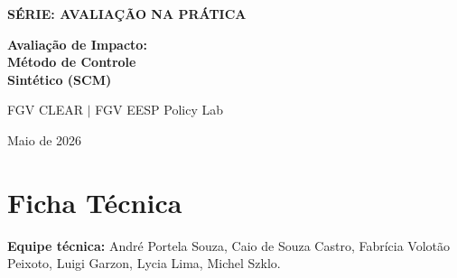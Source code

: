 \documentclass[12pt, a4paper, openany]{book}
\begin{document}
\thispagestyle{empty}
\begin{center}
\vspace*{4cm}
{\Large\bfseries\color{clearlightblue} SÉRIE: AVALIAÇÃO NA PRÁTICA}
\vspace{1.5cm}

{\Huge\bfseries\color{clearblue} Avaliação de Impacto:\\[0.3cm]
Método de Controle\\[0.3cm]
Sintético (SCM)}

\vspace{2cm}
{\large FGV CLEAR $|$ FGV EESP Policy Lab}

\vspace{0.5cm}
{\large Maio de 2026}

\vfill

\begin{abstract}
\noindent Este guia apresenta o método de controle sintético (SCM) e suas extensões recentes para avaliação de impacto de políticas públicas. O SCM é particularmente útil quando há uma única unidade tratada --- ou poucas --- e um conjunto de unidades de controle potenciais, com dados em painel. O guia cobre desde o SCM clássico de \cite{AbadieGardeazabal2003} e \cite{AbadieDiamondHainmueller2010,AbadieDiamondHainmueller2015} até extensões como o SCM Aumentado \citep{BenMichaelEtAl2021}, o Controle Sintético Generalizado \citep{Xu2017}, o \textit{Synthetic Difference-in-Differences} \citep{ArkhangelskyEtAl2021}, e métodos de controle sintético com adoção escalonada \citep{BenMichaelFellerRothstein2022,CattaneoFengPalombaTitiunik2025}. A replicação empírica avalia o impacto da Lei Seca brasileira (Lei~11.705/2008) sobre a mortalidade no trânsito, usando países latino-americanos como pool de doadores. Todos os exemplos incluem código completo em R.
\end{abstract}
\end{center}
\newpage

\thispagestyle{empty}
\chapter*{Ficha Técnica}

\textbf{Equipe técnica:} André Portela Souza, Caio de Souza Castro, Fabrícia Volotão Peixoto, Luigi Garzon, Lycia Lima, Michel Szklo.
\end{document}
